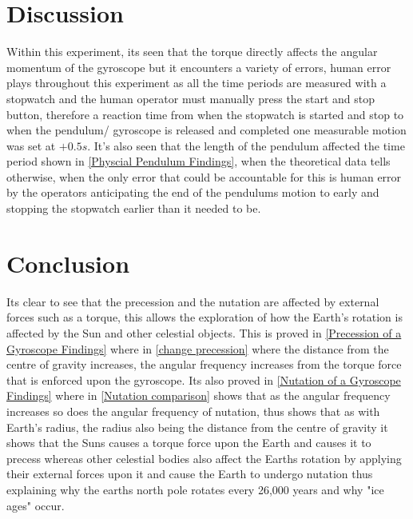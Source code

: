 \documentclass[12pt]{article}
\begin{document}
\section{Discussion}
\label{Disscussion Section}

Within this experiment, its seen that the torque directly affects the angular momentum of the gyroscope but it encounters a variety of errors, human error plays throughout this experiment as all the time periods are measured with a stopwatch and the human operator must manually press the start and stop button, therefore a reaction time from when the stopwatch is started and stop to when the pendulum/ gyroscope is released and completed one measurable motion was set at $+0.5s$. It's also seen that the length of the pendulum affected the time period shown in \cref{Physcial Pendulum Findings}, when the theoretical data tells otherwise, when the only error that could be accountable for this is human error by the operators anticipating the end of the pendulums motion to early and stopping the stopwatch earlier than it needed to be. \\

\section{Conclusion}
\label{Conclusion Section}

Its clear to see that the precession and the nutation are affected by external forces such as a torque, this allows the exploration of how the Earth's rotation is affected by the Sun and other celestial objects. This is proved in \cref{Precession of a Gyroscope Findings} where in \cref{change precession} where the distance from the centre of gravity increases, the angular frequency increases from the torque force that is enforced upon the gyroscope. Its also proved in \cref{Nutation of a Gyroscope Findings} where in \cref{Nutation comparison} shows that as the angular frequency increases so does the angular frequency of nutation, thus shows that as with Earth's radius, the radius also being the distance from the centre of gravity it shows that the Suns causes a torque force upon the Earth and causes it to precess whereas other celestial bodies also affect the Earths rotation by applying their external forces upon it and cause the Earth to undergo nutation thus explaining why the earths north pole rotates every 26,000 years and why "ice ages" occur. \\



\end{document}
